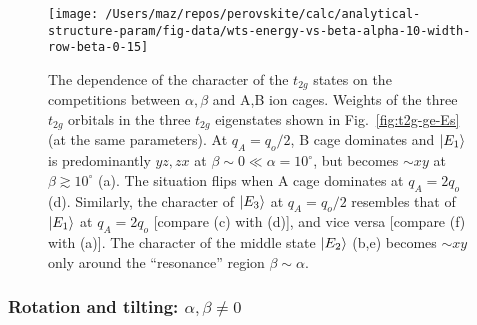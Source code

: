 \documentclass[a4paper,prb,twocolumn]{revtex4-1}  %
\begin{document}
\begin{figure}[htbp]
\begin{center}
\texttt{[image: /Users/maz/repos/perovskite/calc/analytical-structure-param/fig-data/wts-energy-vs-beta-alpha-10-width-row-beta-0-15]}
\caption{
The dependence of the character of the $t_{2g}$ states
on the competitions between
$\alpha,\beta$ and 
A,B ion cages.
Weights of the three $t_{2g}$ orbitals in the three 
$t_{2g}$ eigenstates 
shown in
Fig.~\ref{fig:t2g-ge-Es}
(at the same parameters).
At $q_A=q_o/2$, B cage dominates and
$\ket{E_1}$ is predominantly $yz,zx$ at $\beta\sim 0\ll\alpha=10^\circ$, but 
becomes $\sim xy$ at $\beta\gtrsim10^\circ$ (a).
The situation flips when A cage dominates at $q_A=2q_o$ (d).
Similarly, the character of $\ket{E_3}$ at 
$q_A=q_o/2$
resembles 
that of $\ket{E_1}$ at $q_A=2q_o$  [compare (c) with (d)], and vice versa [compare (f) with (a)].
The character of the middle state $\ket{E_2}$ (b,e)
becomes $\sim xy$ only around the ``resonance'' region
$\beta\sim \alpha$.
}
\label{fig:t2g-ge-wts}
\end{center}
\end{figure}


\subsubsection{Rotation and tilting: $\alpha,\beta\neq 0$}
\label{sec:t2g-gen}
\end{document}
